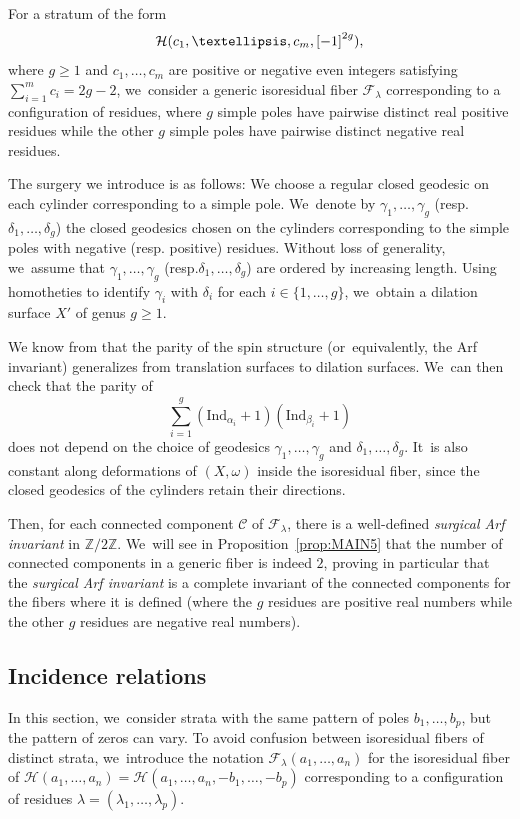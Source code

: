 \documentclass[11pt]{article}
\newcommand{\resp}{resp.\xspace}
\theoremstyle{definition}
\begin{document}
For a stratum of the form
\[
\mathcal{H}(c_{1},\dots,c_{m},\rec[-1][2g]),
\]
where $g\geq 1$ and $c_{1},\dots,c_{m}$ are positive or negative even integers satisfying $\sum_{i=1}^m c_{i} = 2g-2$, we~consider a generic isoresidual fiber $\mathcal{F}_{\lambda}$ corresponding to a configuration of residues, where $g$ simple poles have pairwise distinct real positive residues while the other $g$ simple poles have pairwise distinct negative real residues.

The surgery we introduce is as follows: We choose a regular closed geodesic on each cylinder corresponding to a simple pole. We~denote by $\gamma_{1},\dots,\gamma_{g}$ (\resp $\delta_{1},\dots,\delta_{g}$) the closed geodesics chosen on the cylinders corresponding to the simple poles with negative (\resp positive) residues. Without loss of generality, we~assume that $\gamma_{1},\dots,\gamma_{g}$ (\resp $\delta_{1},\dots,\delta_{g}$) are ordered by increasing length. Using homotheties to identify $\gamma_{i}$ with $\delta_{i}$ for each $i \in \lbrace{ 1,\dots,g \rbrace}$, we~obtain a dilation surface $X'$ of genus $g \geq 1$.

We know from \cite{ABW,Kawazumi} that the parity of the spin structure (or~equivalently, the Arf invariant) generalizes from translation surfaces to dilation surfaces. We~can then check that the parity of
\[
\sum_{i=1}^{g} (\mathrm{Ind}_{\alpha_{i}}+1)(\mathrm{Ind}_{\beta_{i}}+1)
\]
does not depend on the choice of geodesics $\gamma_{1},\dots,\gamma_{g}$ and $\delta_{1},\dots,\delta_{g}$. It~is also constant along deformations of $(X,\omega)$ inside the isoresidual fiber, since the closed geodesics of the cylinders retain their directions.

Then, for each connected component $\mathcal{C}$ of $\mathcal{F}_{\lambda}$, there is a well-defined \textit{surgical Arf invariant} in $\mathbb{Z}/2\mathbb{Z}$. We~will see in Proposition~\ref{prop:MAIN5} that the number of connected components in a generic fiber is indeed $2$, proving in particular that the \textit{surgical Arf invariant} is a complete invariant of the connected components for the fibers where it is defined (where the $g$ residues are positive real numbers while the other $g$ residues are negative real numbers).

\subsection{Incidence relations}\label{sub:Incidence}

In this section, we~consider strata with the same pattern of poles $b_{1},\dots,b_{p}$, but the pattern of zeros can vary. To avoid confusion between isoresidual fibers of distinct strata, we~introduce the notation $\mathcal{F}_{\lambda}(a_{1},\dots,a_{n})$ for the isoresidual fiber of $\mathcal{H}(a_{1},\dots,a_{n}) =
\mathcal{H}(a_{1},\dots,a_{n}, -b_1,\ldots, -b_p)$ corresponding to a configuration of residues $\lambda=(\lambda_{1},\dots,\lambda_{p})$.
\end{document}
